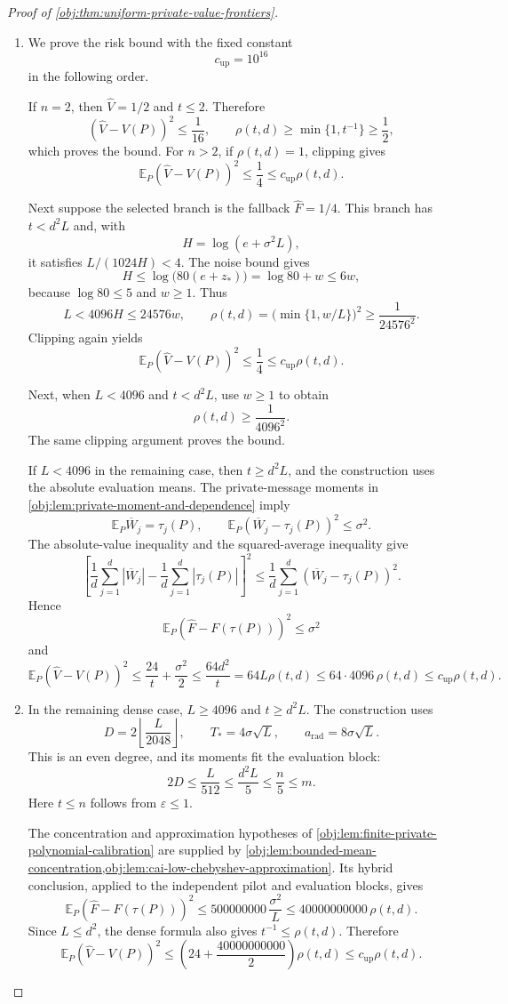 \documentclass[11pt]{article}
\begin{document}
\begin{proof}[Proof of \cref{obj:thm:uniform-private-value-frontiers}]
\begin{enumerate}
\item
We prove the risk bound with the fixed constant
\[
c_{\mathrm{up}}=10^{16}
\]
in the following order.

If \(n=2\), then \(\widehat V=1/2\) and \(t\le2\). Therefore
\[
(\widehat V-V(P))^2\le\frac1{16},
\qquad
\rho(t,d)\ge\min\{1,t^{-1}\}\ge\frac12,
\]
which proves the bound. For \(n>2\), if \(\rho(t,d)=1\), clipping gives
\[
\mathbb E_P(\widehat V-V(P))^2\le\frac14
\le c_{\mathrm{up}}\rho(t,d).
\]

Next suppose the selected branch is the fallback \(\widehat F=1/4\).
This branch has \(t<d^2L\) and, with
\[
H=\log(e+\sigma^2L),
\]
it satisfies \(L/(1024H)<4\). The noise bound gives
\[
H\le\log\!\bigl(80(e+z_*)\bigr)
=\log80+w\le6w,
\]
because \(\log80\le5\) and \(w\ge1\). Thus
\[
L<4096H\le24576w,
\qquad
\rho(t,d)=\bigl(\min\{1,w/L\}\bigr)^2
\ge\frac1{24576^2}.
\]
Clipping again yields
\[
\mathbb E_P(\widehat V-V(P))^2
\le\frac14
\le c_{\mathrm{up}}\rho(t,d).
\]

Next, when \(L<4096\) and \(t<d^2L\), use \(w\ge1\) to obtain
\[
\rho(t,d)\ge\frac1{4096^2}.
\]
The same clipping argument proves the bound.

If \(L<4096\) in the remaining case, then \(t\ge d^2L\), and the construction uses the absolute evaluation means. The private-message moments in
\cref{obj:lem:private-moment-and-dependence} imply
\[
\mathbb E_P\overline W_j=\tau_j(P),
\qquad
\mathbb E_P(\overline W_j-\tau_j(P))^2\le\sigma^2.
\]
The absolute-value inequality and the squared-average inequality give
\[
\left[
\frac1d\sum_{j=1}^d|\overline W_j|
-\frac1d\sum_{j=1}^d|\tau_j(P)|
\right]^2
\le\frac1d\sum_{j=1}^d
       (\overline W_j-\tau_j(P))^2.
\]
Hence
\[
\mathbb E_P(\widehat F-F(\tau(P)))^2\le\sigma^2
\]
and
\[
\mathbb E_P(\widehat V-V(P))^2
\le\frac{24}{t}+\frac{\sigma^2}{2}
\le\frac{64d^2}{t}
=64L\rho(t,d)
\le64\cdot4096\,\rho(t,d)
\le c_{\mathrm{up}}\rho(t,d).
\]

\item
In the remaining dense case, \(L\ge4096\) and \(t\ge d^2L\).
The construction uses
\[
D=2\left\lfloor\frac{L}{2048}\right\rfloor,
\qquad T_*=4\sigma\sqrt L,\qquad
a_{\mathrm{rad}}=8\sigma\sqrt L.
\]
This is an even degree, and its moments fit the evaluation block:
\[
2D\le\frac{L}{512}
\le\frac{d^2L}{5}
\le\frac n5\le m.
\]
Here \(t\le n\) follows from \(\varepsilon\le1\).

The concentration and approximation hypotheses of
\cref{obj:lem:finite-private-polynomial-calibration} are supplied by
\cref{obj:lem:bounded-mean-concentration,obj:lem:cai-low-chebyshev-approximation}.
Its hybrid conclusion, applied to the independent pilot and evaluation blocks, gives
\[
\mathbb E_P(\widehat F-F(\tau(P)))^2
\le500000000\,\frac{\sigma^2}{L}
\le40000000000\,\rho(t,d).
\]
Since \(L\le d^2\), the dense formula also gives \(t^{-1}\le\rho(t,d)\).
Therefore
\[
\mathbb E_P(\widehat V-V(P))^2
\le\left(24+\frac{40000000000}{2}\right)\rho(t,d)
\le c_{\mathrm{up}}\rho(t,d).
\]


\end{enumerate}
\end{proof}
\end{document}
